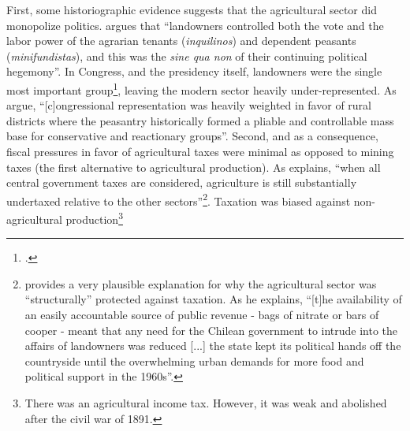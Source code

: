 \documentclass[onesided]{article}\usepackage[]{graphicx}\usepackage[]{color}
\begin{document}
	First, some historiographic evidence suggests that the agricultural sector did  monopolize politics. \citet[p. 13]{Zeitlin:1984aa} argues that ``landowners controlled both the vote and the labor power of the agrarian tenants (\emph{inquilinos}) and dependent peasants (\emph{minifundistas}), and this was the \emph{sine qua non} of their continuing political hegemony''. In Congress, and the presidency itself, landowners were the single most important group\footnote{\citet[p. 45]{Bauer:2008kx}.}, leaving the modern sector heavily under-represented. As \citet[p. 1748]{Baland2008} argue, ``[c]ongressional representation was heavily weighted in favor of rural districts where the peasantry historically formed a pliable and controllable mass base for conservative and reactionary groups''. Second, and as a consequence, fiscal pressures in favor of agricultural taxes were minimal as opposed to mining taxes (the first alternative to agricultural production). As \citet[p. 56]{Best1976} explains, ``when all central government taxes are considered, agriculture is still substantially undertaxed relative to the other sectors''\footnote{
	\citet[p. 81]{Bauer:2008kx} provides a very plausible explanation for why the agricultural sector was ``structurally'' protected against taxation. As he explains, ``[t]he availability of an easily accountable source of public revenue - bags of nitrate or bars of cooper - meant that any need for the Chilean government to intrude into the affairs of landowners was reduced [...] the state kept its political hands off the countryside until the overwhelming urban demands for more food and political support in the 1960s''.
	}. Taxation was biased against non-agricultural production\footnote{
	There was an agricultural income tax. However, it was weak and abolished after the civil war of 1891.
}
\end{document}
